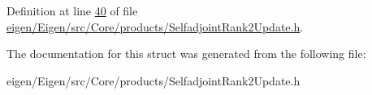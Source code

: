 Definition at line \hyperlink{eigen_2_eigen_2src_2_core_2products_2_selfadjoint_rank2_update_8h_source_l00040}{40} of file \hyperlink{eigen_2_eigen_2src_2_core_2products_2_selfadjoint_rank2_update_8h_source}{eigen/\+Eigen/src/\+Core/products/\+Selfadjoint\+Rank2\+Update.\+h}.



The documentation for this struct was generated from the following file\+:\begin{DoxyCompactItemize}
\item 
eigen/\+Eigen/src/\+Core/products/\+Selfadjoint\+Rank2\+Update.\+h\end{DoxyCompactItemize}
